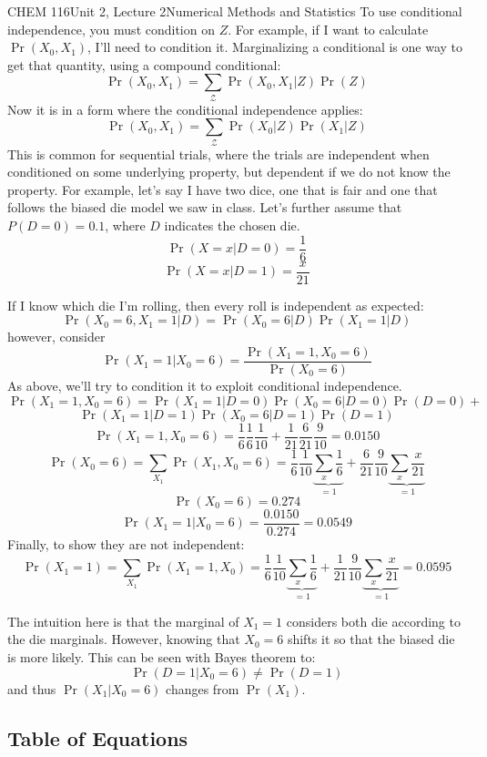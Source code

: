 \documentclass{article}
\begin{document}
\begin{tdoc}{CHEM 116}{Unit 2, Lecture 2}{Numerical Methods and Statistics}
To use conditional independence, you must condition on $Z$. For
example, if I want to calculate $\Pr(X_0, X_1)$, I'll need to
condition it. Marginalizing a conditional is one way to get that
quantity, using a compound conditional:
\[
\Pr(X_0, X_1) = \sum_\mathcal{Z}\Pr(X_0, X_1 | Z) \Pr(Z)
\]
Now it is in a form where the conditional independence applies:
\[
\Pr(X_0, X_1) = \sum_\mathcal{Z}\Pr(X_0 | Z) \Pr(X_1 | Z)
\]
This is common for sequential trials, where the trials are independent
when conditioned on some underlying property, but dependent if we do
not know the property. For example, let's say I have two dice, one
that is fair and one that follows the biased die model we saw in
class. Let's further assume that $P(D = 0) = 0.1$, where $D$ indicates
the chosen die.
\[
\Pr(X=x | D = 0) = \frac{1}{6}
\]
\[
\Pr(X=x | D = 1) = \frac{x}{21}
\]

If I know which die I'm rolling, then every roll is independent
as expected:
\[
\Pr (X_0 = 6, X_1 = 1 | D) = \Pr (X_0 = 6 | D) \Pr (X_1 = 1 | D)
\]
however, consider
\[
\Pr (X_1 = 1 | X_0 = 6) = \frac{\Pr(X_1 = 1, X_0 = 6)}{\Pr (X_0 = 6)}
\]
As above, we'll try to condition it to exploit conditional
independence.
\[
\Pr(X_1 = 1, X_0 = 6) = \Pr(X_1 = 1 | D = 0) \Pr(X_0 = 6 | D = 0) \Pr (D = 0) +
\]
\[
\Pr(X_1 = 1 | D = 1) \Pr(X_0 = 6 | D = 1) \Pr (D = 1)
\]
\[
\Pr(X_1 = 1, X_0 = 6) = \frac{1}{6}\frac{1}{6}\frac{1}{10} + \frac{1}{21}\frac{6}{21}\frac{9}{10} = 0.0150
\]
\[
\Pr(X_0 = 6) = \sum_{X_1} \Pr(X_1, X_0 = 6) = \frac{1}{6}\frac{1}{10}\underbrace{\sum_{x} \frac{1}{6}}_{=1} + \frac{6}{21}\frac{9}{10} \underbrace{\sum_{x} \frac{x}{21}}_{=1}
\]
\[
\Pr(X_0 = 6)  = 0.274
\]
\[
\Pr (X_1 = 1 | X_0 = 6) = \frac{0.0150}{0.274} = 0.0549
\]
Finally, to show they are not independent:
\[
\Pr(X_1 = 1) = \sum_{X_1} \Pr(X_1 = 1, X_0) = \frac{1}{6}\frac{1}{10}\underbrace{\sum_{x} \frac{1}{6}}_{=1} + \frac{1}{21}\frac{9}{10} \underbrace{\sum_{x} \frac{x}{21}}_{=1} = 0.0595
\]

The intuition here is that the marginal of $X_1 = 1$ considers both
die according to the die marginals. However, knowing that $X_0 = 6$
shifts it so that the biased die is more likely. This can be seen with
Bayes theorem to:
\[
\Pr(D = 1 | X_0 = 6) \neq \Pr (D=1)
\]
and thus $\Pr (X_1 | X_0 = 6)$ changes from $\Pr(X_1)$.

\subsection{Table of Equations}


\end{tdoc}
\end{document}
